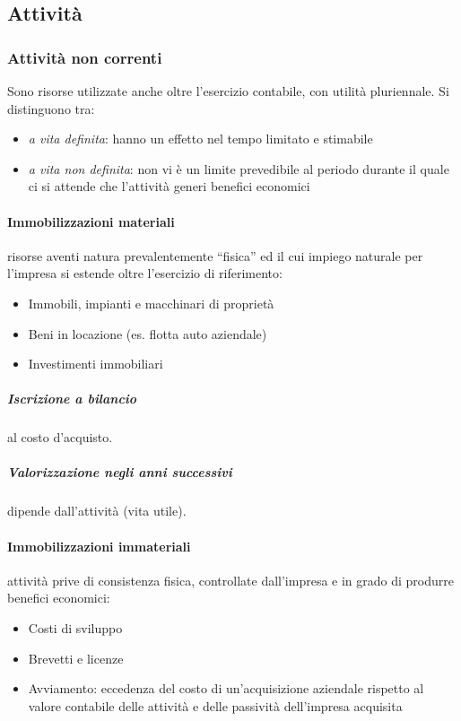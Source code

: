 \subsection{Attività}

\subsubsection{Attività non correnti}
Sono risorse utilizzate anche oltre l’esercizio contabile, con utilità pluriennale. Si distinguono tra:
\begin{itemize}
    \item \emph{a vita definita}: hanno un effetto nel tempo limitato e stimabile
    \item \emph{a vita non definita}: non vi è un limite prevedibile al periodo
    durante il quale ci si attende che l’attività generi benefici economici
\end{itemize}

\paragraph{Immobilizzazioni materiali} risorse aventi natura prevalentemente ``fisica''
ed il cui impiego naturale per l’impresa si estende oltre l’esercizio di riferimento:
\begin{itemize}
    \item Immobili, impianti e macchinari di proprietà
    \item Beni in locazione (es. flotta auto aziendale)
    \item Investimenti immobiliari
\end{itemize}

\subparagraph{Iscrizione a bilancio} al costo d'acquisto.
\subparagraph{Valorizzazione negli anni successivi} dipende dall’attività (vita utile).

\paragraph{Immobilizzazioni immateriali} attività prive di consistenza fisica, controllate
dall’impresa e in grado di produrre benefici economici:
\begin{itemize}
    \item Costi di sviluppo
    \item Brevetti e licenze
    \item Avviamento: eccedenza del costo di un’acquisizione aziendale rispetto
    al valore contabile delle attività e delle passività dell’impresa acquisita
\end{itemize}

